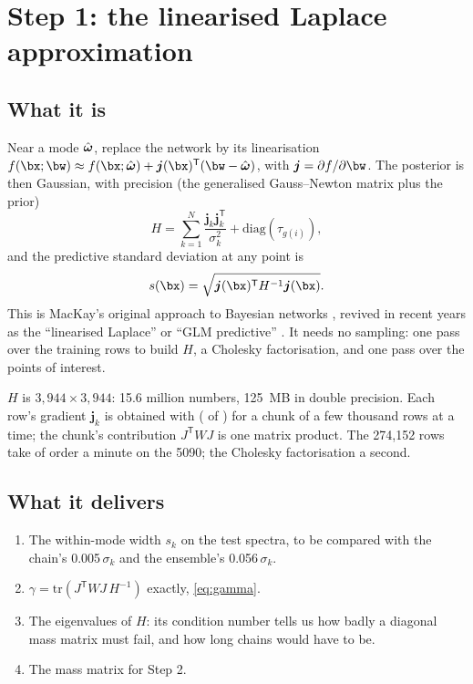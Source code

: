 \section{Step 1: the linearised Laplace approximation}
\label{sec:laplace}

\subsection{What it is}

Near a mode $\hat{\boldsymbol{\omega}}$, replace the network by its linearisation
$f(\bx;\bw) \approx f(\bx;\what) + \boldsymbol{j}(\bx)^{\mathsf T}(\bw - \what)$, with
$\boldsymbol{j} = \partial f/\partial\bw$. The posterior is then Gaussian, with
precision (the generalised Gauss--Newton matrix plus the prior)
\begin{equation}
  H = \sum_{k=1}^{N} \frac{\boldsymbol{j}_k \boldsymbol{j}_k^{\mathsf T}}{\sigma_k^2}
    + \mathrm{diag}(\tau_{g(i)}) ,
  \label{eq:H}
\end{equation}
and the predictive standard deviation at any point is
\begin{equation}
  s(\bx) = \sqrt{\boldsymbol{j}(\bx)^{\mathsf T} H^{-1} \boldsymbol{j}(\bx)} .
  \label{eq:laplace_s}
\end{equation}
This is MacKay's original approach to Bayesian networks \cite{MacKay:1992}, revived in
recent years as the ``linearised Laplace'' or ``GLM predictive''
\cite{Immer:2021,Daxberger:2021}. It needs no sampling: one pass over the training rows to
build $H$, a Cholesky factorisation, and one pass over the points of interest.

\begin{aside}
$H$ is $3{,}944 \times 3{,}944$: 15.6 million numbers, 125~MB in double precision. Each
row's gradient $\boldsymbol{j}_k$ is obtained with  ( of
) for a chunk of a few thousand rows at a time; the chunk's contribution
$J^{\mathsf T} W J$ is one matrix product. The 274,152 rows take of order a minute on the
5090; the Cholesky factorisation a second.
\end{aside}

\subsection{What it delivers}

\begin{enumerate}
  \item The within-mode width $s_k$ on the test spectra, to be compared with the chain's
    0.005$\,\sigma_k$ and the ensemble's 0.056$\,\sigma_k$.
  \item $\gamma = \mathrm{tr}(J^{\mathsf T}WJ\,H^{-1})$ exactly, \cref{eq:gamma}.
  \item The eigenvalues of $H$: its condition number tells us how badly a diagonal mass
    matrix must fail, and how long chains would have to be.
  \item The mass matrix for Step 2.
\end{enumerate}

